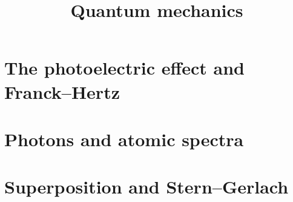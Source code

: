 \documentclass{handout}
\title{Quantum mechanics}
\begin{document}
\maketitle
\practiceinstructions


\section{The photoelectric effect and Franck--Hertz}

\section{Photons and atomic spectra}

\section{Superposition and Stern--Gerlach}
\end{document}
